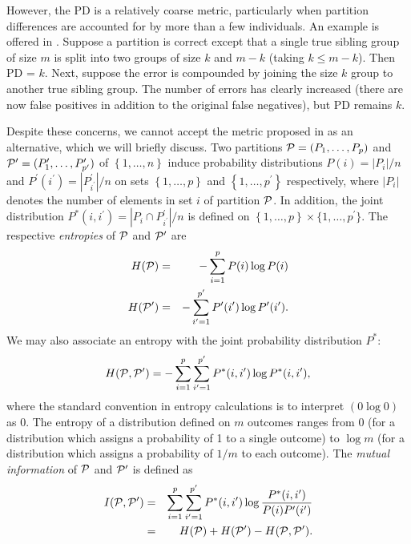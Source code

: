 \documentclass[twoside,10pt,twocolumn]{article}
\newcommand{\calp}{{\cal P}}
\begin{document}
However, the PD is a relatively coarse metric, particularly when partition differences are accounted for by 
more than a few individuals. An example is offered in \citet{BrownDexter2012}. Suppose a partition is 
correct except that a single true sibling group of size $m$ is split into two groups of size $k$ and $m-k$ 
(taking $k \leq m-k$). Then PD = $k$. Next, suppose the error is compounded by joining the size $k$ group  
to another true sibling group. The number of errors has clearly increased (there are now false positives in 
addition to the original false negatives), but PD remains $k$. 


Despite these concerns, we cannot accept the metric proposed in \citet{BrownDexter2012} as an alternative, 
which we will briefly discuss. Two partitions $\calp = (P_1, \ldots, P_p)$ and $\calp^\prime = (P^\prime_1, 
\ldots, P^\prime_{p^\prime})$ of $\left\{ 1, \ldots, n\right\}$ induce probability distributions $P(i) = |
P_i|/n$ and $P^\prime(i^\prime) = |P^\prime_{i^\prime}|/n$ on sets $\left\{ 1, \ldots, p\right\}$ and $\left
\{ 1, \ldots, p^\prime\right\}$ respectively, where $|P_i|$ denotes the number of elements in set $i$ of 
partition $\calp$. In addition, the joint distribution  $P^*(i,i^\prime) = |P_i \cap P^\prime_{i^\prime}|/n$ 
is defined on  $\left\{ 1, \ldots, p\right\} \times \{ 1, \ldots, p^\prime \}$. The respective 
\emph{entropies} of  $\calp$ and $\calp^\prime$ are
\begin{eqnarray}
H(\calp) &=& - \sum_{i=1}^p P(i) \log P(i) \\
H(\calp^\prime) &=& - \sum_{i^\prime =1}^{p^\prime} P^\prime(i^\prime) \log P^\prime(i^\prime).
\end{eqnarray}
We may also associate an entropy with the joint probability distribution $P^*$:
\begin{displaymath}
H(\calp, \calp^\prime) = - \sum_{i=1}^p \sum_{i^\prime=1}^{p^\prime} P^*(i, i^\prime) \log P^*(i, i^\prime),
\end{displaymath}
where the standard convention in entropy calculations is to interpret $(0\log 0)$ as 0. The entropy of a 
distribution defined on $m$ outcomes ranges from 0 (for a distribution which assigns a probability of 1 to a 
single outcome) to $\log m$ (for a distribution which assigns a probability of $1/m$ to each outcome). The 
\emph{mutual information} of  $\calp$ and $\calp^\prime$ is defined as 
\begin{eqnarray*}
I(\calp, \calp^\prime) & = & \sum_{i=1}^p \sum_{i^\prime=1}^{p^\prime} P^*(i, i^\prime) \log \frac{P^*(i, i^
\prime)}{P(i)P^\prime(i^\prime)} \\
	& = & H(\calp) + H(\calp^\prime) - H(\calp, \calp^\prime).
\end{eqnarray*}
\end{document}
